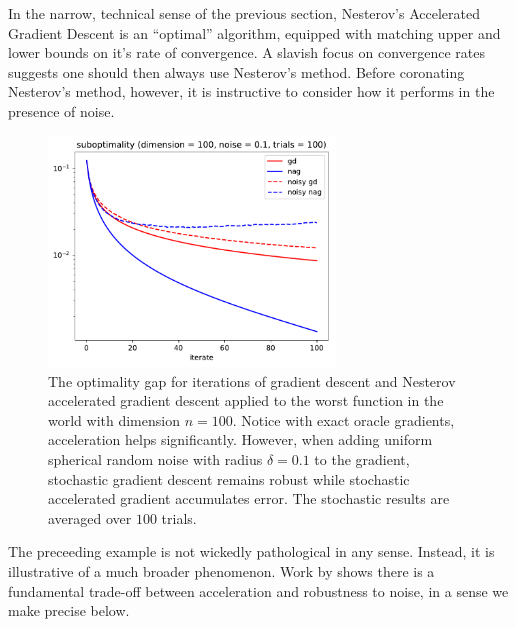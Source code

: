 In the narrow, technical sense of the previous section, Nesterov's Accelerated Gradient 
Descent is an ``optimal'' algorithm, equipped with matching upper and lower bounds on 
it's rate of convergence. A slavish focus on convergence rates suggests one should then
always use Nesterov's method. Before coronating Nesterov's method, however, it
is instructive to consider how it performs in the presence of noise.

\begin{figure}
\begin{center}
\includegraphics[width=3in]{figures/nag-noise.pdf}
\end{center}
\caption{The optimality gap for iterations of gradient descent and Nesterov accelerated gradient descent applied to the worst function in the world with dimension $n=100$. Notice with exact oracle gradients, acceleration helps significantly. However, when adding uniform spherical random noise with radius $\delta=0.1$ to the gradient, stochastic gradient descent remains robust while stochastic accelerated gradient accumulates error. The stochastic results are averaged over $100$ trials.}
\end{figure}

The preceeding example is not wickedly pathological in any sense. Instead, it is
illustrative of a much broader phenomenon. Work by \cite{devolder2014first} shows there is a
fundamental trade-off between acceleration and robustness to noise, in a sense
we make precise below.

